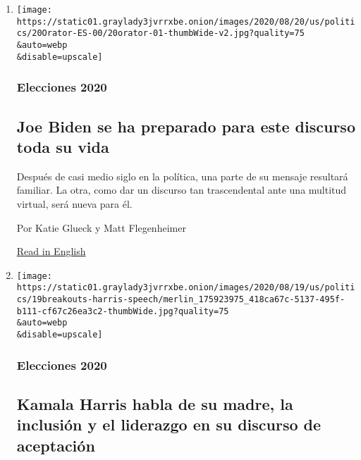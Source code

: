 \begin{enumerate}
\def\labelenumi{\arabic{enumi}.}
\item
  \href{/es/2020/08/20/espanol/estados-unidos/joe-biden-discurso.html}{}

  \texttt{[image: https://static01.graylady3jvrrxbe.onion/images/2020/08/20/us/politics/20Orator-ES-00/20orator-01-thumbWide-v2.jpg?quality=75\\\&auto=webp\\\&disable=upscale]}

  \hypertarget{elecciones-2020}{%
  \subsubsection{Elecciones 2020}\label{elecciones-2020}}

  \hypertarget{joe-biden-se-ha-preparado-para-este-discurso-toda-su-vida}{%
  \subsection{Joe Biden se ha preparado para este discurso toda su
  vida}\label{joe-biden-se-ha-preparado-para-este-discurso-toda-su-vida}}

  Después de casi medio siglo en la política, una parte de su mensaje
  resultará familiar. La otra, como dar un discurso tan trascendental
  ante una multitud virtual, será nueva para él.

  Por Katie Glueck y Matt Flegenheimer

  \href{https://www.nytimes3xbfgragh.onion/2020/08/20/us/politics/joe-biden-convention-speech.html}{Read
  in English}
\item
  \href{/es/2020/08/20/espanol/estados-unidos/kamala-harris-discurso-completo.html}{}

  \texttt{[image: https://static01.graylady3jvrrxbe.onion/images/2020/08/19/us/politics/19breakouts-harris-speech/merlin\_175923975\_418ca67c-5137-495f-b111-cf67c26ea3c2-thumbWide.jpg?quality=75\\\&auto=webp\\\&disable=upscale]}

  \hypertarget{elecciones-2020-1}{%
  \subsubsection{Elecciones 2020}\label{elecciones-2020-1}}

  \hypertarget{kamala-harris-habla-de-su-madre-la-inclusiuxf3n-y-el-liderazgo-en-su-discurso-de-aceptaciuxf3n}{%
  \subsection{Kamala Harris habla de su madre, la inclusión y el
  liderazgo en su discurso de
  aceptación}\label{kamala-harris-habla-de-su-madre-la-inclusiuxf3n-y-el-liderazgo-en-su-discurso-de-aceptaciuxf3n}}


\end{enumerate}
